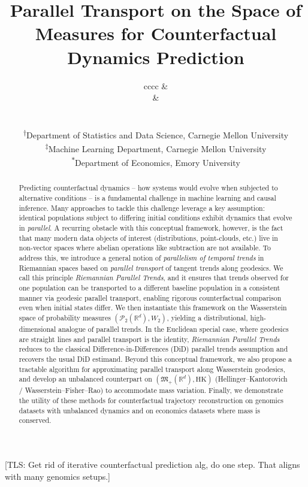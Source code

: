 \documentclass[11pt]{article}
\title{Parallel Transport on the Space of Measures for Counterfactual Dynamics Prediction}
\author{
\begin{tabular}{cccc} %
\multicolumn{2}{c}{\makecell[c]{Tristan Luca Saidi\textsuperscript{\(\dagger\)}\\ \href{mailto:tsaidi@andrew.cmu.edu}{\nolinkurl{tsaidi@andrew.cmu.edu}}}} &
\multicolumn{2}{c}{\makecell[c]{Gonzalo Mena\textsuperscript{\(\dagger\)}\\ \href{mailto:gmena@andrew.cmu.edu}{\nolinkurl{gmena@andrew.cmu.edu}}}} \\[2em]
\multicolumn{2}{c}{\makecell[c]{Larry Wasserman\textsuperscript{\(\dagger, \ddagger\)}\\ \href{mailto:larry@stat.cmu.edu}{\nolinkurl{larry@stat.cmu.edu}}}} &
\multicolumn{2}{c}{\makecell[c]{Florian Gunsilius\textsuperscript{\(*\)}\\ \href{mailto:florian.felix.gunsilius@emory.edu}{\nolinkurl{fgunsil@emory.edu}}}} \\[1.5em]
\end{tabular}
\small\\ %
\textsuperscript{\(\dagger\)}Department of Statistics and Data Science, Carnegie Mellon University\\
\textsuperscript{\(\ddagger\)}Machine Learning Department, Carnegie Mellon University\\
\textsuperscript{\(*\)}Department of Economics, Emory University
}
\newcommand{\ndfg}[1]{{\color{magenta}[Florian: #1]}}
\newcommand{\tls}[1]{{\color{cyan}[TLS: #1]}}
\begin{document}
\maketitle

\tls{Get rid of iterative counterfactual prediction alg, do one step. That aligns with many genomics setups.}

\begin{abstract}
    Predicting counterfactual dynamics -- how systems would evolve when subjected to alternative conditions -- is a fundamental challenge in machine learning and causal inference. Many approaches to tackle this challenge leverage a key assumption: identical populations subject to differing initial conditions exhibit dynamics that evolve in \textit{parallel}. A recurring obstacle with this conceptual framework, however, is the fact that many modern data objects of interest (distributions, point-clouds, etc.) live in non-vector spaces where abelian operations like subtraction are not available. To address this, we introduce a general notion of \textit{parallelism of temporal trends} in Riemannian spaces based on \textit{parallel transport} of tangent trends along geodesics. We call this principle \textit{Riemannian Parallel Trends}, and it ensures that trends observed for one population can be transported to a different baseline population in a consistent manner via geodesic parallel transport, enabling rigorous counterfactual comparison even when initial states differ. We then instantiate this framework on the Wasserstein space of probability measures $(\mathcal{P}_2(\mathbb{R}^d), W_2)$, yielding a distributional, high-dimensional analogue of parallel trends. In the Euclidean special case, where geodesics are straight lines and parallel transport is the identity, \textit{Riemannian Parallel Trends} reduces to the classical Difference-in-Differences (DiD) parallel trends assumption and recovers the usual DiD estimand. Beyond this conceptual framework, we also propose a tractable algorithm for approximating parallel transport along Wasserstein geodesics, and develop an unbalanced counterpart on $(\mathfrak{M}_+(\mathbb{R}^d), \mathrm{HK})$ (Hellinger–Kantorovich / Wasserstein–Fisher–Rao) to accommodate mass variation. Finally, we demonstrate the utility of these methods for counterfactual trajectory reconstruction on genomics datasets with unbalanced dynamics and on economics datasets where mass is conserved.
\end{abstract}
\end{document}
